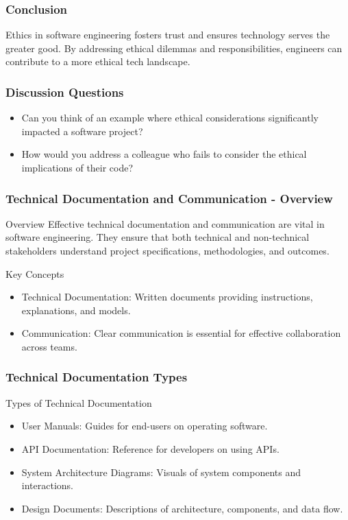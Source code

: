 \documentclass{beamer}
\begin{document}
\begin{frame}[fragile]
    \frametitle{Conclusion}
    Ethics in software engineering fosters trust and ensures technology serves the greater good. By addressing ethical dilemmas and responsibilities, engineers can contribute to a more ethical tech landscape.
\end{frame}

\begin{frame}[fragile]
    \frametitle{Discussion Questions}
    \begin{itemize}
        \item Can you think of an example where ethical considerations significantly impacted a software project?
        \item How would you address a colleague who fails to consider the ethical implications of their code?
    \end{itemize}
\end{frame}

\begin{frame}[fragile]
    \frametitle{Technical Documentation and Communication - Overview}
    \begin{block}{Overview}
        Effective technical documentation and communication are vital in software engineering. They ensure that both technical and non-technical stakeholders understand project specifications, methodologies, and outcomes. 
    \end{block}
    \begin{block}{Key Concepts}
        \begin{itemize}
            \item Technical Documentation: Written documents providing instructions, explanations, and models.
            \item Communication: Clear communication is essential for effective collaboration across teams.
        \end{itemize}
    \end{block}
\end{frame}

\begin{frame}[fragile]
    \frametitle{Technical Documentation Types}
    \begin{block}{Types of Technical Documentation}
        \begin{itemize}
            \item User Manuals: Guides for end-users on operating software.
            \item API Documentation: Reference for developers on using APIs.
            \item System Architecture Diagrams: Visuals of system components and interactions.
            \item Design Documents: Descriptions of architecture, components, and data flow.
        \end{itemize}
    \end{block}
\end{frame}
\end{document}
